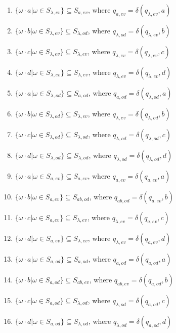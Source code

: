 \documentclass{article}
\begin{document}
\begin{enumerate}
    \item $\{\omega\cdot a|\omega\in S_{\lambda,ev}\} \subseteq S_{a,ev}$, where $q_{a,ev}=\delta(q_{\lambda,ev},a)$
    \item $\{\omega\cdot b|\omega\in S_{\lambda,ev}\} \subseteq S_{\lambda,od}$, where $q_{\lambda,od}=\delta(q_{\lambda,ev},b)$
    \item $\{\omega\cdot c|\omega\in S_{\lambda,ev}\} \subseteq S_{\lambda,ev}$, where $q_{\lambda,ev}=\delta(q_{\lambda,ev},c)$
    \item $\{\omega\cdot d|\omega\in S_{\lambda,ev}\} \subseteq S_{\lambda,ev}$, where $q_{\lambda,ev}=\delta(q_{\lambda,ev},d)$
 
    \item $\{\omega\cdot a|\omega\in S_{\lambda,od}\} \subseteq S_{a,od}$, where $q_{a,od}=\delta(q_{\lambda,od},a)$
    \item $\{\omega\cdot b|\omega\in S_{\lambda,od}\} \subseteq S_{\lambda,ev}$, where $q_{\lambda,ev}=\delta(q_{\lambda,od},b)$
    \item $\{\omega\cdot c|\omega\in S_{\lambda,od}\} \subseteq S_{\lambda,od}$, where $q_{\lambda,od}=\delta(q_{\lambda,od},c)$
    \item $\{\omega\cdot d|\omega\in S_{\lambda,od}\} \subseteq S_{\lambda,od}$, where $q_{\lambda,od}=\delta(q_{\lambda,od},d)$
 
    \item $\{\omega\cdot a|\omega\in S_{a,ev}\} \subseteq S_{a,ev}$, where $q_{a,ev}=\delta(q_{a,ev},a)$
    \item $\{\omega\cdot b|\omega\in S_{a,ev}\} \subseteq S_{ab,od}$, where $q_{ab,od}=\delta(q_{a,ev},b)$
    \item $\{\omega\cdot c|\omega\in S_{a,ev}\} \subseteq S_{\lambda,ev}$, where $q_{\lambda,ev}=\delta(q_{a,ev},c)$
    \item $\{\omega\cdot d|\omega\in S_{a,ev}\} \subseteq S_{\lambda,ev}$, where $q_{\lambda,ev}=\delta(q_{a,ev},d)$
    
    \item $\{\omega\cdot a|\omega\in S_{a,od}\} \subseteq S_{a,od}$, where $q_{a,od}=\delta(q_{a,od},a)$
    \item $\{\omega\cdot b|\omega\in S_{a,od}\} \subseteq S_{ab,ev}$, where $q_{ab,ev}=\delta(q_{a,od},b)$
    \item $\{\omega\cdot c|\omega\in S_{a,od}\} \subseteq S_{\lambda,od}$, where $q_{\lambda,od}=\delta(q_{a,od},c)$
    \item $\{\omega\cdot d|\omega\in S_{a,od}\} \subseteq S_{\lambda,od}$, where $q_{\lambda,od}=\delta(q_{a,od},d)$
    

\end{enumerate}
\end{document}
